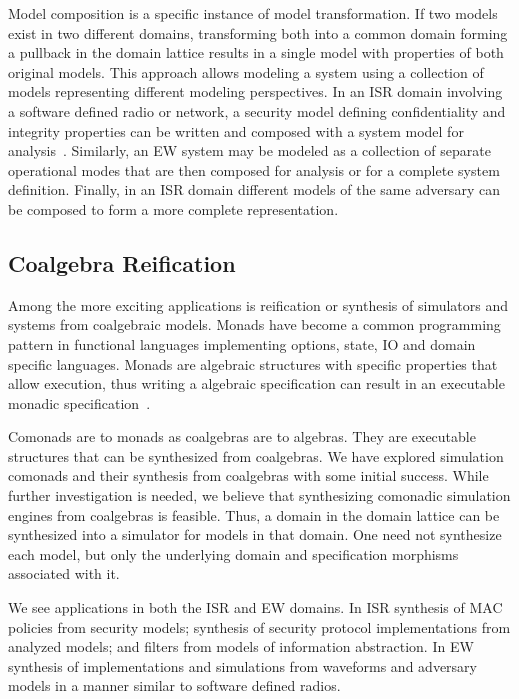 \documentclass[12pt]{article}
\begin{document}
Model composition is a specific instance of model transformation.  If two models exist in
two different domains, transforming both into a common domain forming a pullback in the
domain lattice results in a single model with properties of both original models.  This
approach allows modeling a system using a collection of models representing different
modeling perspectives.  In an ISR domain involving a software defined radio or network, a
security model defining confidentiality and integrity properties can be written and
composed with a system model for analysis~\cite{Kimmell:08:System-Synthesi}.  Similarly,
an EW system may be modeled as a collection of separate operational modes that are then
composed for analysis or for a complete system definition.  Finally, in an ISR domain
different models of the same adversary can be composed to form a more complete
representation.

\subsection{Coalgebra Reification}

Among the more exciting applications is reification or synthesis of simulators and systems
from coalgebraic models.  Monads have become a common programming pattern in functional
languages implementing options, state, IO and domain specific languages.  Monads are
algebraic structures with specific properties that allow execution, thus writing a
algebraic specification can result in an executable monadic
specification~\cite{Kimmell:08:Synthesizing-So,Peck:11:Hardware/Softwa}.

Comonads are to monads as coalgebras are to algebras.  They are executable structures that
can be synthesized from coalgebras.  We have explored simulation comonads and their
synthesis from coalgebras with some initial success.  While further investigation is
needed, we believe that synthesizing comonadic simulation engines from coalgebras is
feasible.  Thus, a domain in the domain lattice can be synthesized into a simulator for
models in that domain.  One need not synthesize each model, but only the underlying domain
and specification morphisms associated with it.

We see applications in both the ISR and EW domains.  In ISR synthesis of MAC policies from
security models; synthesis of security protocol implementations from analyzed models; and
filters from models of information abstraction.  In EW synthesis of implementations and
simulations from waveforms and adversary models in a manner similar to software defined
radios.

\begin{small}


\end{small}
\end{document}
